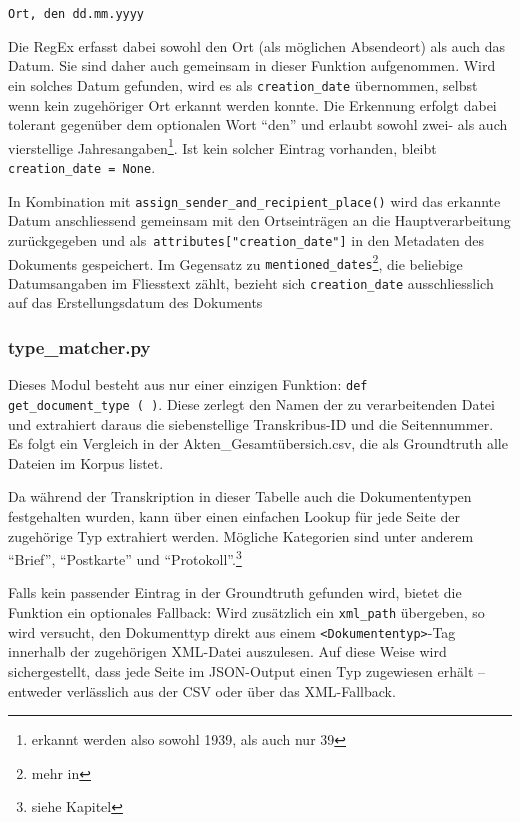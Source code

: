 \documentclass[12pt, a4paper, ngerman, bidi=default]{article}
\newcommand{\code}[1]{\colorbox{VeryLightGray}{\texttt{#1}}} %
\begin{document}
\begin{center}
\texttt{Ort, den dd.mm.yyyy}
\end{center}

\noindent Die RegEx erfasst dabei sowohl den Ort (als möglichen Absendeort) als auch das Datum. Sie sind daher auch gemeinsam in dieser Funktion aufgenommen. Wird ein solches Datum gefunden, wird es als \code{creation\_date} übernommen, selbst wenn kein zugehöriger Ort erkannt werden konnte. Die Erkennung erfolgt dabei tolerant gegenüber dem optionalen Wort \enquote{den} und erlaubt sowohl zwei- als auch vierstellige Jahresangaben\footnote{erkannt werden also sowohl 1939, als auch nur 39}. Ist kein solcher Eintrag vorhanden, bleibt \code{creation\_date = None}.

In Kombination mit \code{assign\_sender\_and\_recipient\_place()} wird das erkannte Datum anschliessend gemeinsam mit den Ortseinträgen an die Hauptverarbeitung zurückgegeben und als\code{ attributes["creation\_date"]} in den Metadaten des Dokuments gespeichert. Im Gegensatz zu \code{mentioned\_dates}\footnote{mehr in }, die beliebige Datumsangaben im Fliesstext zählt, bezieht sich \code{creation\_date} ausschliesslich auf das Erstellungsdatum des Dokuments


\subsubsection{type\_matcher.py}\label{subsection:type_matcher}
Dieses Modul besteht aus nur einer einzigen Funktion: \code{def get\_document\_type~(~)}. Diese zerlegt den Namen der zu verarbeitenden Datei und extrahiert daraus die siebenstellige Transkribus-ID und die Seitennummer. Es folgt ein Vergleich in der Akten\_Gesamtübersich.csv, die als Groundtruth alle Dateien im Korpus listet.

Da während der Transkription in dieser Tabelle auch die Dokumententypen festgehalten wurden, kann über einen einfachen Lookup für jede Seite der zugehörige Typ extrahiert werden. Mögliche Kategorien sind unter anderem \enquote{Brief}, \enquote{Postkarte} und \enquote{Protokoll}.\footnote{siehe Kapitel } 

Falls kein passender Eintrag in der Groundtruth gefunden wird, bietet die Funktion ein optionales Fallback: Wird zusätzlich ein \code{xml\_path} übergeben, so wird versucht, den Dokumenttyp direkt aus einem \code{<Dokumententyp>}-Tag innerhalb der zugehörigen XML-Datei auszulesen. Auf diese Weise wird sichergestellt, dass jede Seite im JSON-Output einen Typ zugewiesen erhält – entweder verlässlich aus der CSV oder über das XML-Fallback.
\end{document}
